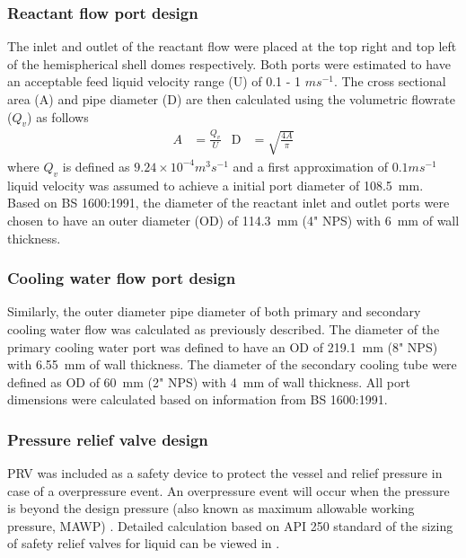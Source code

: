 \subsubsection{Reactant flow port design}
The inlet and outlet of the reactant flow were placed at the top right and top left of the hemispherical shell domes respectively. Both ports were estimated to have an acceptable feed liquid velocity range (U) of 0.1 - 1 $ms^{-1}$. The cross sectional area (A) and pipe diameter (D) are then calculated using the volumetric flowrate ($Q_v$) as follows
\begin{align}
    A &= \frac{Q_v}{U} &
    \mathrm{D} &= \sqrt{\frac{4A}{\pi}}
\end{align}
where $Q_v$ is defined as $9.24 \times 10^{-4} m^3s^{-1}$ and a first approximation of $0.1 ms^{-1}$ liquid velocity was assumed to achieve a initial port diameter of \SI{108.5}{\milli \metre}. Based on BS 1600:1991, the diameter of the reactant inlet and outlet ports were chosen to have an outer diameter (OD) of \SI{114.3}{\milli \metre} (4" NPS) with \SI{6}{\milli \metre} of wall thickness. 

\subsubsection{Cooling water flow port design}
Similarly, the outer diameter pipe diameter of both primary and secondary cooling water flow was calculated as previously described. The diameter of the primary cooling water port was defined to have an OD of \SI{219.1}{\milli \metre} (8" NPS) with \SI{6.55}{\milli \metre} of wall thickness. The diameter of the secondary cooling tube were defined as OD of \SI{60}{\milli \metre} (2" NPS) with \SI{4}{\milli \metre} of wall thickness. All port dimensions were calculated based on information from BS 1600:1991. 


\subsubsection{Pressure relief valve design}
PRV was included as a safety device to protect the vessel and relief pressure in case of a overpressure event. An overpressure event will occur when the pressure is beyond the design pressure (also known as maximum allowable working pressure, MAWP) \cite{marsha_lecture_nodate}. Detailed calculation based on API 250 standard \cite{api_standard_520_sizing_2013} of the sizing of safety relief valves for liquid can be viewed in .

